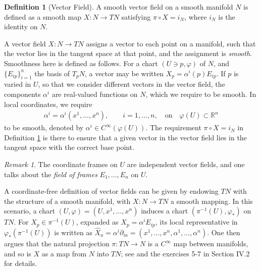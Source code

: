 \documentclass[psamsfonts]{amsart}
\theoremstyle{definition}
\newtheorem{defn}[thm]{Definition}
\theoremstyle{remark}
\newtheorem{rem}[thm]{Remark}
\newcommand*\R{\mathds{R}}
\numberwithin{equation}{section}
\begin{document}
\begin{defn}[Vector Field]\label{def:vectorfield}
A smooth vector field on a smooth manifold $N$ is defined as a smooth map $X:N\rightarrow TN$ satisfying $\pi \circ X = i_N$, where $i_N$ is the identity on $N$. 
\end{defn}
A vector field $X: N \rightarrow TN$ assigns a vector to each point on a manifold, such that the vector lies in the tangent space at that point, and the assignment is \textit{smooth}. Smoothness here is defined as follows. For a chart $(U\ni p, \varphi)$ of $N$, and $\{E_{ip}\}_{i = 1}^n$ the basis of $T_pN$, a vector may be written $X_p = \alpha^i(p) E_{ip}$. If $p$ is varied in $U$, so that we consider different vectors in the vector field, the components $\alpha^i$ are real-valued functions on $N$, which we require to be smooth. In local coordinates, we require 
\begin{equation}\label{eq:vectorfieldcoeff}
\begin{aligned}
\alpha^i = \alpha^i(x^1, \dots, x^n), \qquad i = 1, \dots, n, \quad \text{on}\quad \varphi(U)\subset \R^n
\end{aligned}
\end{equation} 
to be smooth, denoted by $\alpha^i \in C^{\infty}(\varphi(U))$. The requirement $\pi \circ X = i_N$ in Definition \ref{def:vectorfield} is there to ensure that a given vector in the vector field lies in the tangent space with the correct base point.%
\begin{rem}
The coordinate frames on $U$ are independent vector fields, and one talks about the \textit{field of frames} $E_1, \dots, E_n$ on $U$. 
\end{rem}
A coordinate-free definition of vector fields can be given by endowing $TN$ with the structure of a smooth manifold, with $X:N\rightarrow TN$ a smooth mapping. In this scenario, a chart $(U, \varphi) = (U, x^1, \dots, x^n)$ induces a chart $(\pi^{-1}(U), \varphi_*)$ on $TN$. For $X_p\in \pi^{-1}(U)$, expanded as $X_p = \alpha^i E_{ip}$, its local representative in $\varphi_*(\pi^{-1}(U))$ is written as $\hat X_a = \alpha^i \partial_{ia} = (x^1, \dots, x^n, \alpha^1, \dots, \alpha^n)$. One then argues that the natural projection $\pi:TN\rightarrow N$ is a $C^{\infty}$ map between manifolds, and so is $X$ as a map from $N$ into $TN$; see \cite{nijmeijer_nonlinear_1990} and the exercises 5-7 in \cite{boothby_2002} Section IV.2 for details. 
\end{document}
